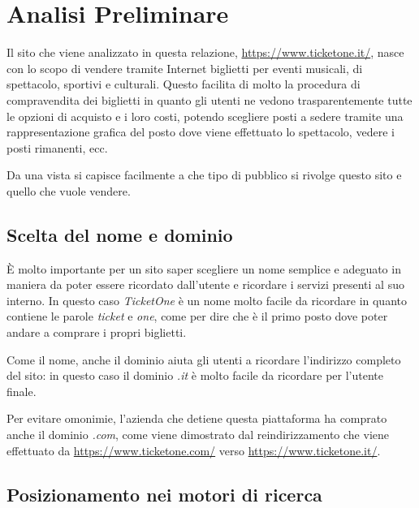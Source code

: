 \section{Analisi Preliminare}\label{analisipre}

Il sito che viene analizzato in questa relazione, \url{https://www.ticketone.it/}, nasce con lo scopo di vendere tramite Internet biglietti per eventi musicali, di spettacolo, sportivi e culturali.
Questo facilita di molto la procedura di compravendita dei biglietti in quanto gli utenti ne vedono trasparentemente tutte le opzioni di acquisto e i loro costi, potendo scegliere posti a sedere tramite una rappresentazione grafica del posto dove viene effettuato lo spettacolo, vedere i posti rimanenti, ecc.
\par Da una vista si capisce facilmente a che tipo di pubblico si rivolge questo sito e quello che vuole vendere.

\subsection{Scelta del nome e dominio}
	
	\`E molto importante per un sito saper scegliere un nome semplice e adeguato in maniera da poter essere ricordato dall'utente e ricordare i servizi presenti al suo interno.
	In questo caso \textit{TicketOne} è un nome molto facile da ricordare in quanto contiene le parole \textit{ticket} e \textit{one}, come per dire che è il primo posto dove poter andare a comprare i propri biglietti.
	\par Come il nome, anche il dominio aiuta gli utenti a ricordare l'indirizzo completo del sito: in questo caso il dominio \textit{.it} è molto facile da ricordare per l'utente finale.
	\par Per evitare omonimie, l'azienda che detiene questa piattaforma ha comprato anche il dominio \textit{.com}, come viene dimostrato dal reindirizzamento che viene effettuato da \url{https://www.ticketone.com/} verso \url{https://www.ticketone.it/}.

\subsection{Posizionamento nei motori di ricerca}

